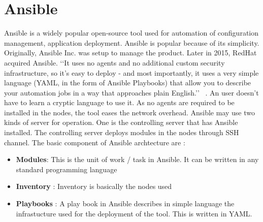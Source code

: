 \section{Ansible}
Ansible is a widely popular open-source tool used for automation of
configuration management, application deployment. Ansible is popular
because of its simplicity. Originally, Ansible Inc.  was setup to
manage the product. Later in 2015, RedHat acquired Ansible.
‘‘It uses no agents and no additional custom security infrastructure,
so it’s easy to deploy - and most importantly, it uses a very simple
language (YAML, in the form of Ansible Playbooks) that allow you to
describe your automation jobs in a way that approaches plain
English.’’  ~\cite {hid-sp18-417-doc-Ansible}.
An user doesn’t have to learn a cryptic language to use it.  As no
agents are required to be installed in the nodes, the tool eases the
network overhead. Ansible may use two kinds of server for operation. One is the
controlling server that has Ansible installed.  The controlling server
deploys modules in the nodes through SSH channel.
The basic component of Ansible archtecture are : 
\begin{itemize}
\item \textbf{Modules}: This is the unit of work / task in Ansible. It
  can be written in any standard programming language
\item \textbf{Inventory} : Inventory is basically the nodes used
\item \textbf{Playbooks} : A play book in Ansible describes in simple
  language the infrastucture used for the deployment of the tool. This
  is written in YAML.
\end{itemize}



